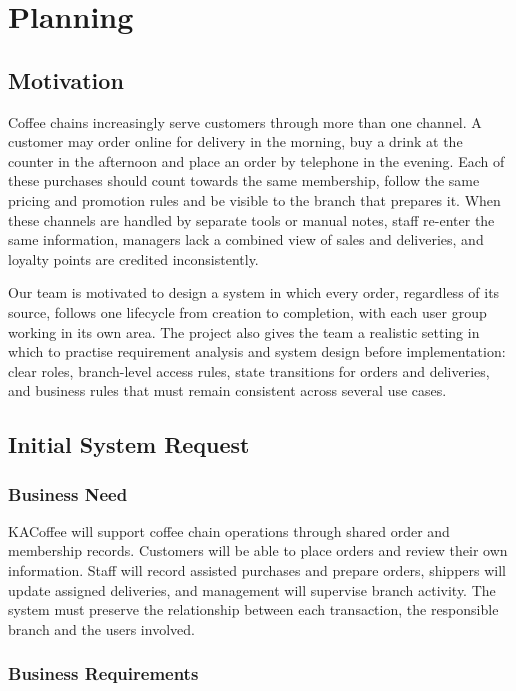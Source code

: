\section{Planning}

\subsection{Motivation}

Coffee chains increasingly serve customers through more than one channel. A customer may order online for delivery in the morning, buy a drink at the counter in the afternoon and place an order by telephone in the evening. Each of these purchases should count towards the same membership, follow the same pricing and promotion rules and be visible to the branch that prepares it. When these channels are handled by separate tools or manual notes, staff re-enter the same information, managers lack a combined view of sales and deliveries, and loyalty points are credited inconsistently.

Our team is motivated to design a system in which every order, regardless of its source, follows one lifecycle from creation to completion, with each user group working in its own area. The project also gives the team a realistic setting in which to practise requirement analysis and system design before implementation: clear roles, branch-level access rules, state transitions for orders and deliveries, and business rules that must remain consistent across several use cases.

\subsection{Initial System Request}

\subsubsection{Business Need}

KACoffee will support coffee chain operations through shared order and membership records. Customers will be able to place orders and review their own information. Staff will record assisted purchases and prepare orders, shippers will update assigned deliveries, and management will supervise branch activity. The system must preserve the relationship between each transaction, the responsible branch and the users involved.

\subsubsection{Business Requirements}

